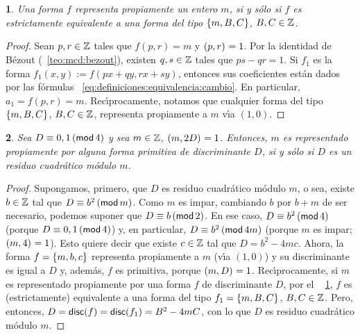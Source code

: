 \theoremstyle{plain}
\newtheorem{teoRepresentaciones}{\teoname}[section]
\newtheorem{lemaRepresentaciones}[teoRepresentaciones]{\lemaname}
\newtheorem{coroRepresentaciones}[teoRepresentaciones]{\coroname}

\theoremstyle{definition}
\newtheorem{defRepresentaciones}[teoRepresentaciones]{}
\newtheorem{obsRepresentaciones}[teoRepresentaciones]{\obsname}


\begin{lemaRepresentaciones}\label{lema:representaciones:propiamente}
	Una forma $f$ representa propiamente un entero $m$, si y s\'olo
	si $f$ es estrictamente equivalente a una forma del tipo
	$\binaria{m,B,C}$, $B,C\in\Enteros$.
\end{lemaRepresentaciones}

\begin{proof}
	Sean $p,r\in\Enteros$ tales que $f(p,r)=m$ y $\mcd{p,r}=1$. Por
	la identidad de B\'ezout (\teoname~\ref{teo:mcd:bezout}), existen
	$q,s\in\Enteros$ tales que $ps-qr=1$. Si $f_1$ es la forma
	$f_1(x,y):=f(px+qy,rx+sy)$, entonces sus coeficientes est\'an
	dados por las f\'ormulas~%
	\eqref{eq:definiciones:equivalencia:cambio}. En particular,
	$a_1=f(p,r)=m$. Rec\'{\i}procamente, notamos que cualquier
	forma del tipo $\binaria{m,B,C}$, $B,C\in\Enteros$, representa
	propiamente a $m$ v\'{\i}a $(1,0)$.
\end{proof}

\begin{lemaRepresentaciones}\label{lema:representaciones:primitiva}
	Sea $D\equiv 0,1\tmodulo[4]$ y sea $m\in\Enteros$,
	$\mcd{m,2D}=1$. Entonces, $m$ es representado propiamente
	por \emph{alguna} forma primitiva de discriminante $D$,
	si y s\'olo si $D$ es un residuo cuadr\'atico m\'odulo $m$.
\end{lemaRepresentaciones}

\begin{proof}
	Supongamos, primero, que $D$ es residuo cuadr\'atico m\'odulo
	$m$, o sea, existe $b\in\Enteros$ tal que $D\equiv b^2\tmodulo[m]$.
	Como $m$ es impar, cambiando $b$ por $b+m$ de ser necesario,
	podemos suponer que $D\equiv b\tmodulo[2]$. En ese caso,
	$D\equiv b^2\tmodulo[4]$ (porque $D\equiv 0,1\tmodulo[4]$) y,
	en particular, $D\equiv b^2\tmodulo[4m]$ (porque $m$ es impar;
	$\mcd{m,4}=1$). Esto quiere decir que existe $c\in\Enteros$ tal
	que $D=b^2-4mc$. Ahora, la forma $f=\binaria{m,b,c}$ representa
	propiamente a $m$ (v\'{\i}a $(1,0)$) y su discriminante es igual a
	$D$ y, adem\'as, $f$ es primitiva, porque $\mcd{m,D}=1$.
	Rec\'{\i}procamente, si $m$ es representado propiamente por
	una forma $f$ de discriminante $D$, por el \lemaname~%
	\ref{lema:representaciones:propiamente}, $f$ es (estrictamente)
	equivalente a una forma del tipo $f_1=\binaria{m,B,C}$,
	$B,C\in\Enteros$. Pero, entonces,
	\begin{math}
		D=\discriminante(f)=\discriminante(f_1)=B^2-4mC
	\end{math},
	con lo que $D$ es residuo cuadr\'atico m\'odulo $m$.
\end{proof}

